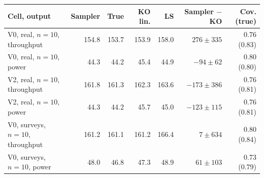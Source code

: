 \begin{tabular}{@{}lrrrrrr@{}}
\toprule
Cell, output & Sampler & True & KO lin. & LS & Sampler $-$ KO & Cov. (true) \\
\midrule
V0, real, $n=10$, throughput & 154.8 & 153.7 & 153.9 & 158.0 & $276\pm335$ & 0.76 (0.83) \\
V0, real, $n=10$, power & 44.3 & 44.2 & 45.4 & 44.9 & $-94\pm62$ & 0.80 (0.80) \\
V2, real, $n=10$, throughput & 161.8 & 161.3 & 162.3 & 163.6 & $-173\pm386$ & 0.76 (0.81) \\
V2, real, $n=10$, power & 44.3 & 44.2 & 45.7 & 45.0 & $-123\pm115$ & 0.76 (0.81) \\
V0, surveys, $n=10$, throughput & 161.2 & 161.1 & 161.2 & 166.4 & $7\pm634$ & 0.80 (0.84) \\
V0, surveys, $n=10$, power & 48.0 & 46.8 & 47.3 & 48.9 & $61\pm103$ & 0.73 (0.79) \\
\bottomrule
\end{tabular}
